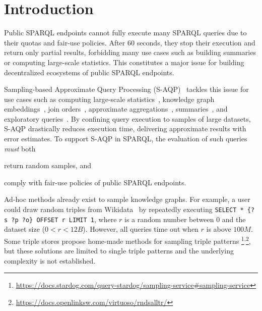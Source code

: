 
\section{Introduction}

Public SPARQL endpoints cannot fully execute many SPARQL queries due
to their quotas and fair-use policies. After 60 seconds, they stop
their execution and return only partial results, forbidding many use
cases such as building summaries or computing large-scale statistics.
This constitutes a major issue for building decentralized ecosystems
of public SPARQL endpoints.

Sampling-based Approximate Query Processing
(S-AQP)~\cite{DBLP:conf/sigmod/AgarwalMKTJMMS14} tackles this issue
for use cases such as computing large-scale
statistics~\cite{soulet2019anytime,10.1007/978-3-319-18818-8_14},
knowledge graph embeddings~\cite{ristoski2016rdf2vec}, join
orders~\cite{DBLP:conf/cidr/LeisRGK017}, approximate
aggregations~\cite{wang2022approximate},
summaries~\cite{10.1007/978-3-030-49461-2_10}, and exploratory
queries~\cite{DBLP:conf/sigmod/AgarwalMKTJMMS14}.  By confining query
execution to samples of large datasets, S-AQP drastically reduces
execution time, delivering approximate results with error estimates.
%
To support S-AQP in SPARQL, the evaluation of such queries \emph{must}
both
\begin{inparaenum}[(i)]
\item return random samples, and
\item comply with fair-use policies of public SPARQL endpoints.
\end{inparaenum}
Ad-hoc methods already exist to sample knowledge graphs.  For example,
a user could draw random triples from
Wikidata~\cite{soulet2019anytime} by repeatedly executing
\verb|SELECT * {?s ?p ?o} OFFSET r LIMIT 1|, where $r$ is a random
number between $0$ and the dataset size ($0<r<12B$). However, all
queries time out when $r$ is above $100M$.
Some triple stores propose home-made methods for sampling triple
patterns%
\footnote{\url{https://docs.stardog.com/query-stardog/sampling-service\#sampling-service}}\textsuperscript{,}\footnote{\url{https://docs.openlinksw.com/virtuoso/rndsalltr/}},
but these solutions are limited to single triple patterns and the
underlying complexity is not established.

